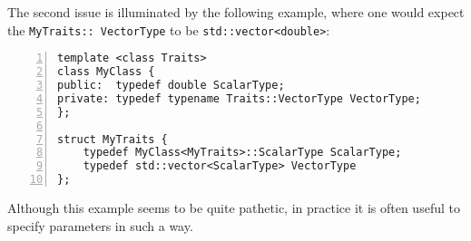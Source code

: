 The second issue is illuminated by the following example, where one
would expect the \texttt{MyTraits:: VectorType} to be \texttt{std::vector<double>}:
\begin{lstlisting}[basicstyle=\ttfamily\scriptsize,numbers=left,numberstyle=\tiny, numbersep=5pt]
template <class Traits>
class MyClass {
public:  typedef double ScalarType;
private: typedef typename Traits::VectorType VectorType;
};

struct MyTraits {
    typedef MyClass<MyTraits>::ScalarType ScalarType;
    typedef std::vector<ScalarType> VectorType
};
\end{lstlisting}
Although this example seems to be quite pathetic, in practice it is
often useful to specify parameters in such a way.

